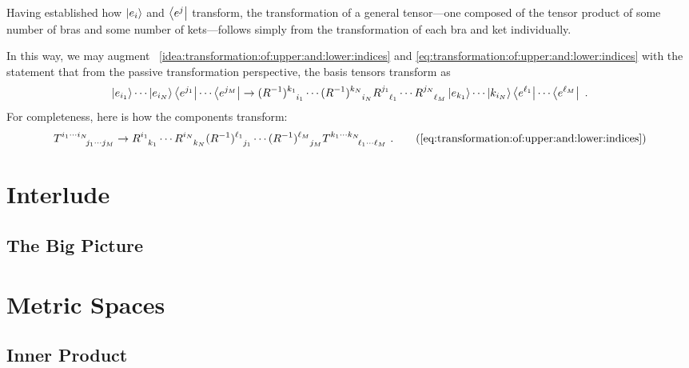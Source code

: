 \documentclass[12pt, oneside]{report}    %
\newenvironment{wide}{\begin{adjustwidth}{0cm}{-6.25cm}}{\end{adjustwidth}}
\let\oldsection\section
\def\section{%
  \setcounter{sidenote}{1}%
  \oldsection
}
\begin{document}
Having established how $\left|e_i\right\rangle$ and $\left\langle e^j\right|$ transform, the transformation of a general tensor---one composed of the tensor product of some number of bras and some number of kets---follows simply from the transformation of each bra and ket individually.

\begin{wide}
In this way, we may augment \bigidearef{}~\ref{idea:transformation:of:upper:and:lower:indices} and \eqref{eq:transformation:of:upper:and:lower:indices} with the statement that from the passive transformation perspective, the basis tensors transform as
\begin{align}
    \ket{e_{i_1}} \cdots \ket{e_{i_N}}
    \bra{e^{j_1}} \cdots \bra{e^{j_M}}
    \to 
    (R\inv)\aij{k_1}{i_1}\cdots (R\inv)\aij{k_N}{i_N}
    R\aij{j_1}{\ell_1}\cdots R\aij{j_N}{\ell_M}
    \ket{e_{k_1}} \cdots \ket{k_{i_N}}
    \bra{e^{\ell_1}} \cdots \bra{e^{\ell_M}} \ .
\end{align}
For completeness, here is how the components transform:
\begin{align}
    T\aij{i_1\cdots i_N}{j_1\cdots j_M}
    \to 
    R\aij{i_1}{k_1}\cdots R\aij{i_N}{k_N}
    (R\inv)\aij{\ell_1}{j_1}\cdots (R\inv)\aij{\ell_M}{j_M}
    T\aij{k_1\cdots k_N}{\ell_1\cdots \ell_M} \ .
    \tag{\ref{eq:transformation:of:upper:and:lower:indices}}
\end{align}
\end{wide}



\chapter{Interlude}
\section{The Big Picture}

\chapter{Metric Spaces}\label{ch:metric:spaces}

\section{Inner Product}
\end{document}
